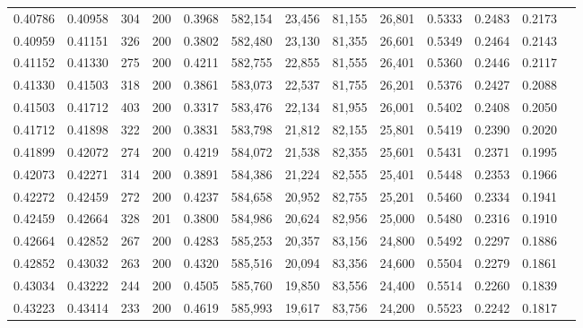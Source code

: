 \begin{tabular}{rrrrrrrrrrrrr}
0.40786 & 0.40958 &    304 & 200 &                                     0.3968 & 582,154 &  23,456 &  81,155 &  26,801 & 0.5333 & 0.2483 & 0.2173 \\
0.40959 & 0.41151 &    326 & 200 &                                     0.3802 & 582,480 &  23,130 &  81,355 &  26,601 & 0.5349 & 0.2464 & 0.2143 \\
0.41152 & 0.41330 &    275 & 200 &                                     0.4211 & 582,755 &  22,855 &  81,555 &  26,401 & 0.5360 & 0.2446 & 0.2117 \\
0.41330 & 0.41503 &    318 & 200 &                                     0.3861 & 583,073 &  22,537 &  81,755 &  26,201 & 0.5376 & 0.2427 & 0.2088 \\
0.41503 & 0.41712 &    403 & 200 &                                     0.3317 & 583,476 &  22,134 &  81,955 &  26,001 & 0.5402 & 0.2408 & 0.2050 \\
0.41712 & 0.41898 &    322 & 200 &                                     0.3831 & 583,798 &  21,812 &  82,155 &  25,801 & 0.5419 & 0.2390 & 0.2020 \\
0.41899 & 0.42072 &    274 & 200 &                                     0.4219 & 584,072 &  21,538 &  82,355 &  25,601 & 0.5431 & 0.2371 & 0.1995 \\
0.42073 & 0.42271 &    314 & 200 &                                     0.3891 & 584,386 &  21,224 &  82,555 &  25,401 & 0.5448 & 0.2353 & 0.1966 \\
0.42272 & 0.42459 &    272 & 200 &                                     0.4237 & 584,658 &  20,952 &  82,755 &  25,201 & 0.5460 & 0.2334 & 0.1941 \\
0.42459 & 0.42664 &    328 & 201 &                                     0.3800 & 584,986 &  20,624 &  82,956 &  25,000 & 0.5480 & 0.2316 & 0.1910 \\
0.42664 & 0.42852 &    267 & 200 &                                     0.4283 & 585,253 &  20,357 &  83,156 &  24,800 & 0.5492 & 0.2297 & 0.1886 \\
0.42852 & 0.43032 &    263 & 200 &                                     0.4320 & 585,516 &  20,094 &  83,356 &  24,600 & 0.5504 & 0.2279 & 0.1861 \\
0.43034 & 0.43222 &    244 & 200 &                                     0.4505 & 585,760 &  19,850 &  83,556 &  24,400 & 0.5514 & 0.2260 & 0.1839 \\
0.43223 & 0.43414 &    233 & 200 &                                     0.4619 & 585,993 &  19,617 &  83,756 &  24,200 & 0.5523 & 0.2242 & 0.1817 \\

\end{tabular}
